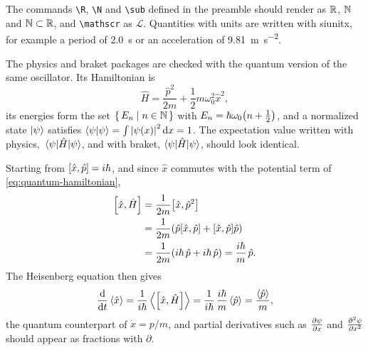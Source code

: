The commands \verb|\R|, \verb|\N| and \verb|\sub| defined in the preamble should render as $\mathbb{R}$, $\mathbb{N}$ and $\mathbb{N} \subset \mathbb{R}$, and \verb|\mathscr| as $\mathscr{L}$.
Quantities with units are written with siunitx, for example a period of \qty{2.0}{s} or an acceleration of \qty{9.81}{m.s^{-2}}.

The physics and braket packages are checked with the quantum version of the same oscillator.
Its Hamiltonian is
\begin{equation}
   \hat{H} = \frac{\hat{p}^2}{2m} + \frac{1}{2} m\omega_0^2 \hat{x}^2 ,
   \label{eq:quantum-hamiltonian}
\end{equation}
its energies form the set $\set{E_n | n \in \mathbb{N}}$ with $E_n = \hbar\omega_0 \pqty{n + \frac{1}{2}}$, and a normalized state $\ket{\psi}$ satisfies $\braket{\psi|\psi} = \int \abs{\psi(x)}^2 \dd{x} = 1$.
The expectation value written with physics, $\ev{\hat{H}}{\psi}$, and with braket, $\braket{\psi | \hat{H} | \psi}$, should look identical.

Starting from $\comm{\hat{x}}{\hat{p}} = i\hbar$, and since $\hat{x}$ commutes with the potential term of \cref{eq:quantum-hamiltonian},
\begin{align}
   \comm{\hat{x}}{\hat{H}} &= \frac{1}{2m}\comm{\hat{x}}{\hat{p}^2} \nonumber \\
                          &= \frac{1}{2m}\pqty{\hat{p}\comm{\hat{x}}{\hat{p}} + \comm{\hat{x}}{\hat{p}}\hat{p}} \nonumber \\
                          &= \frac{1}{2m}\pqty{i\hbar\,\hat{p} + i\hbar\,\hat{p}} = \frac{i\hbar}{m}\,\hat{p} .
\end{align}
The Heisenberg equation then gives
\begin{equation}
   \dv{t}\ev{\hat{x}} = \frac{1}{i\hbar}\ev{\comm{\hat{x}}{\hat{H}}} = \frac{1}{i\hbar}\,\frac{i\hbar}{m}\ev{\hat{p}} = \frac{\ev{\hat{p}}}{m} ,
\end{equation}
the quantum counterpart of $\dot{x} = p/m$, and partial derivatives such as $\pdv{\psi}{x}$ and $\pdv[2]{\psi}{x}$ should appear as fractions with $\partial$.
